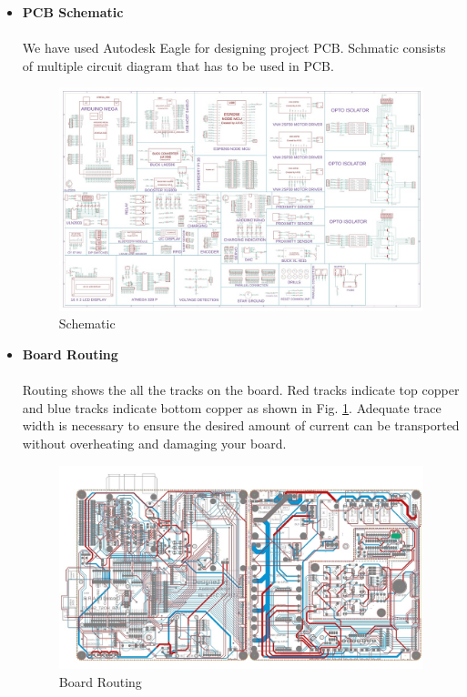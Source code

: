 \begin{itemize}[wide, labelwidth=!, labelindent=0pt]
    \item \textbf{PCB Schematic}
    \vspace{-0.5cm}
    \paragraph{} We have used Autodesk Eagle for designing project PCB. Schmatic consists of multiple circuit diagram that has to be used in PCB.

    \begin{figure}[H]
    \centering
    \includegraphics[width = 13cm]{project/images/schematic.jpg}
    \caption{Schematic}
    \end{figure}

    \item \textbf{Board Routing}
    \vspace{-0.5cm}
    \paragraph{} Routing shows the all the tracks on the board. Red tracks indicate top copper and blue tracks indicate bottom copper as shown in Fig. \ref{boardrouting}. Adequate trace width is necessary to ensure the desired amount of current can be transported without overheating and damaging your board. 

    \begin{figure}[H]
    \centering
    \includegraphics[width = 13cm]{project/images/board_routing_resized.jpg}
    \caption{Board Routing} \label{boardrouting}
    \end{figure}
    

\end{itemize}
